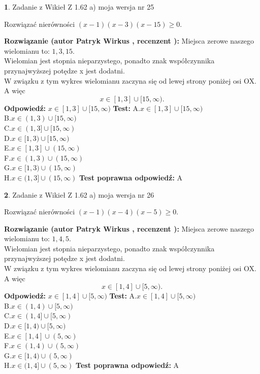 \documentclass[12pt, a4paper]{article}
\theoremstyle{definition} %
\newtheorem{zad}{}
\newcommand{\zadStart}[1]{\begin{zad}#1\newline}
\newcommand{\zadStop}{\end{zad}}
\newcommand{\rozwStart}[2]{\noindent \textbf{Rozwiązanie (autor #1 , recenzent #2): }\newline}
\newcommand{\rozwStop}{\newline}
\newcommand{\odpStart}{\noindent \textbf{Odpowiedź:}\newline}
\newcommand{\odpStop}{\newline}
\newcommand{\testStart}{\noindent \textbf{Test:}\newline}
\newcommand{\testStop}{\newline}
\newcommand{\kluczStart}{\noindent \textbf{Test poprawna odpowiedź:}\newline}
\newcommand{\kluczStop}{\newline}
\begin{document}
\zadStart{Zadanie z Wikieł Z 1.62 a) moja wersja nr 25}

Rozwiązać nierówności $(x-1)(x-3)(x-15)\ge0$.
\zadStop
\rozwStart{Patryk Wirkus}{}
Miejsca zerowe naszego wielomianu to: $1, 3, 15$.\\
Wielomian jest stopnia nieparzystego, ponadto znak współczynnika przy\linebreak najwyższej potędze x jest dodatni.\\ W związku z tym wykres wielomianu zaczyna się od lewej strony poniżej osi OX. A więc $$x \in [1,3] \cup [15,\infty).$$
\rozwStop
\odpStart
$x \in [1,3] \cup [15,\infty)$
\odpStop
\testStart
A.$x \in [1,3] \cup [15,\infty)$\\
B.$x \in (1,3) \cup [15,\infty)$\\
C.$x \in (1,3] \cup [15,\infty)$\\
D.$x \in [1,3) \cup [15,\infty)$\\
E.$x \in [1,3] \cup (15,\infty)$\\
F.$x \in (1,3) \cup (15,\infty)$\\
G.$x \in [1,3) \cup (15,\infty)$\\
H.$x \in (1,3] \cup (15,\infty)$
\testStop
\kluczStart
A
\kluczStop



\zadStart{Zadanie z Wikieł Z 1.62 a) moja wersja nr 26}

Rozwiązać nierówności $(x-1)(x-4)(x-5)\ge0$.
\zadStop
\rozwStart{Patryk Wirkus}{}
Miejsca zerowe naszego wielomianu to: $1, 4, 5$.\\
Wielomian jest stopnia nieparzystego, ponadto znak współczynnika przy\linebreak najwyższej potędze x jest dodatni.\\ W związku z tym wykres wielomianu zaczyna się od lewej strony poniżej osi OX. A więc $$x \in [1,4] \cup [5,\infty).$$
\rozwStop
\odpStart
$x \in [1,4] \cup [5,\infty)$
\odpStop
\testStart
A.$x \in [1,4] \cup [5,\infty)$\\
B.$x \in (1,4) \cup [5,\infty)$\\
C.$x \in (1,4] \cup [5,\infty)$\\
D.$x \in [1,4) \cup [5,\infty)$\\
E.$x \in [1,4] \cup (5,\infty)$\\
F.$x \in (1,4) \cup (5,\infty)$\\
G.$x \in [1,4) \cup (5,\infty)$\\
H.$x \in (1,4] \cup (5,\infty)$
\testStop
\kluczStart
A
\kluczStop
\end{document}
